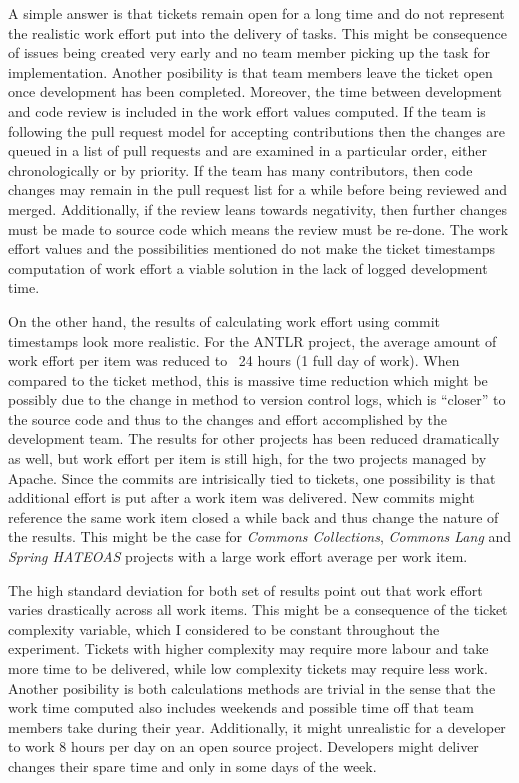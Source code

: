\documentclass{mpaper}
\begin{document}
A simple answer is that tickets remain open for a long time and do not represent
the realistic work effort put into the delivery of tasks. This might be
consequence of issues being created very early and no team member picking up the
task for implementation. Another posibility is that team members leave the
ticket open once development has been completed. Moreover, the time between
development and code review is included in the work effort values computed. If
the team is following the pull request model for accepting contributions then
the changes are queued in a list of pull requests and are examined in a
particular order, either chronologically or by priority. If the team has many
contributors, then code changes may remain in the pull request list for a while
before being reviewed and merged. Additionally, if the review leans towards
negativity, then further changes must be made to source code which means the
review must be re-done. The work effort values and the possibilities mentioned
do not make the ticket timestamps computation of work effort a viable solution
in the lack of logged development time.

On the other hand, the results of calculating work effort using commit
timestamps look more realistic. For the ANTLR project, the average amount of
work effort per item was reduced to ~24 hours (1 full day of work). When
compared to the ticket method, this is massive time reduction which might be
possibly due to the change in method to version control logs, which is
``closer'' to the source code and thus to the changes and effort accomplished by
the development team. The results for other projects has been reduced
dramatically as well, but work effort per item is still high, for the two
projects managed by Apache. Since the commits are intrisically tied to tickets,
one possibility is that additional effort is put after a work item was
delivered. New commits might reference the same work item closed a while back
and thus change the nature of the results. This might be the case for
\emph{Commons Collections}, \emph{Commons Lang} and \emph{Spring HATEOAS}
projects with a large work effort average per work item.

The high standard deviation for both set of results point out that work effort
varies drastically across all work items. This might be a consequence of the
ticket complexity variable, which I considered to be constant throughout the
experiment. Tickets with higher complexity may require more labour and take more
time to be delivered, while low complexity tickets may require less work.
Another posibility is both calculations methods are trivial in the sense that
the work time computed also includes weekends and possible time off that team
members take during their year. Additionally, it might unrealistic for a
developer to work 8 hours per day on an open source project. Developers might
deliver changes their spare time and only in some days of the week.  
\end{document}
